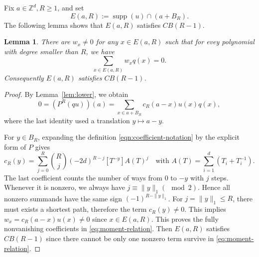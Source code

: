 \documentclass[11pt,reqno]{amsart}
\newcommand\Z{\ensuremath{\mathbb{Z}}}
\newcommand{\supp}{\operatorname{supp}}
\newtheorem{lemma}[theorem]{Lemma}
\theoremstyle{definition}
\theoremstyle{plain}
\numberwithin{equation}{section}
\begin{document}
Fix $a\in \Z^d, R\ge 1$, and set
\begin{equation*}
    E(a,R):=\supp (u)\cap (a+B_R).
\end{equation*}
The following lemma shows that $E(a,R)$ satisfies $CB(R-1)$.
\begin{lemma}\label{lem:cb}
    There are $w_x\neq 0$ for any $x\in E(a,R)$ such that for evey polynomial with degree smaller than $R$, we have
    \begin{equation}\label{eq:moment-relation}
        \sum_{x\in E(a,R)}w_xq(x)=0.
    \end{equation}
    Consequently $E(a,R)$ satisfies $CB(R-1)$.
\end{lemma}
\begin{proof}
    By Lemma~\ref{lem:lower}, we obtain
    \begin{equation*}
        0=(P^R(qu))(a)=\sum_{x\in a+B_R}c_R(a-x)u(x)q(x),
    \end{equation*}
    where the last identity used a translation $y\mapsto a-y$. 

    For $y\in B_R$, expanding the definition \eqref{eqn:coefficient-notation} by the explicit form of $P$ gives
    \begin{equation*}
        c_R(y)=\sum_{j=0}^R\binom Rj(-2d)^{R-j}[T^{-y}]A(T)^j\quad \text{with } A(T)=\sum_{i=1}^d(T_i+T_i^{-1}).
    \end{equation*}
    The last coefficient counts the number of ways from $0$ to $-y$ with $j$ steps. Whenever it is nonzero, we always have $j\equiv \|y\|_1 (\mod 2)$. Hence all nonzero summands have the same sign $(-1)^{R-\|y\|_1}$. For $j = \|y\|_1\le R$, there must exists a shortest path, therefore the term $c_R(y)\neq 0$. This implies $w_x=c_R(a-x)u(x)\neq 0$ since $x\in E(a,R)$. This proves the fully nonvanishing coefficients in \eqref{eq:moment-relation}. Then $E(a,R)$ satisfies $CB(R-1)$ since there cannot be only one nonzero term survive in \eqref{eq:moment-relation}.
\end{proof}
\end{document}
